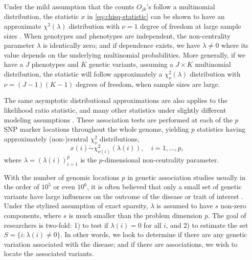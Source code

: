 Under the mild assumption that the counts $O_{jk}$'s follow a multinomial distribution, the statistic $x$ in \eqref{eq:chisq-statistic} can be shown to have an approximate $\chi^2(\lambda)$ distribution with $\nu=1$ degree of freedom at large sample sizes \citep{agresti2018introduction}. 
When genotypes and phenotypes are independent, the non-centrality parameter $\lambda$ is identically zero; and if dependence exists, we have $\lambda\neq0$ where its value depends on the underlying multinomial probabilities.
More generally, if we have a $J$ phenotypes and $K$ genetic variants, assuming a $J\times K$ multinomial distribution, the statistic will follow approximately a $\chi^2_{\nu}(\lambda)$ distribution with $\nu = (J-1)(K-1)$ degrees of freedom, when sample sizes are large.

The same asymptotic distributional approximations are also applies to the likelihood ratio statistic, and many other statistics under slightly different modeling assumptions \cite{gao2019upass}.
These association tests are performed at each of the $p$ SNP marker locations throughout the whole genome, yielding $p$ statistics having approximately (non-)central $\chi^2_{\nu}$ distributions,
\begin{equation} \label{eq:model-chisquare-approx}
    x(i) \mathrel{\dot\sim} \chi_{\nu(i)}^2\left(\lambda(i)\right), \quad i=1,\ldots,p,
\end{equation}
where $\lambda = (\lambda(i))_{i=1}^p$ is the $p$-dimensional non-centrality parameter.

With the number of genomic locations $p$ in genetic association studies usually in the order of $10^5$ or even $10^6$, it is often believed that only a small set of genetic variants have large influences on the outcome of the disease or trait of interest .
Under the stylized assumption of exact sparsity, $\lambda$ is assumed to have $s$ non-zero components, where $s$ is much smaller than the problem dimension $p$. 
The goal of researchers is two-fold: 1) to test if $\lambda(i)=0$ for all $i$, and 2) to estimate the set $S=\{i:\lambda(i)\neq 0\}$.
In other words, we look to determine if there are any genetic variation associated with the disease; and if there are associations, we wish to locate the associated variants.

